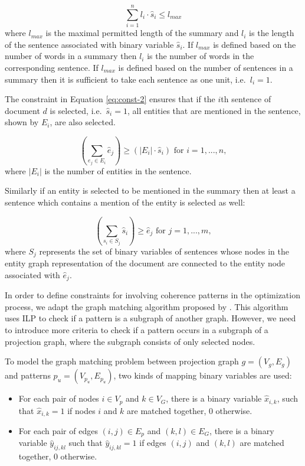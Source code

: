 \begin{equation}
\sum_{i=1}^{n} l_i \cdot \hat{s}_i \le l_{max}
\end{equation}
where $l_{max}$ is the maximal permitted length of the summary and $l_i$ is the length of the sentence associated with binary variable $\hat{s}_i$.  
If $l_{max}$ is defined based on the number of words in a summary then $l_i$ is the number of words in the corresponding sentence.  
If $l_{max}$ is defined based on the number of sentences in a summary then it is sufficient to take each sentence as one unit, i.e.\ $l_i=1$. 

The constraint in Equation \ref{eq:const-2} ensures that if the $i$th sentence of document $d$ is selected, i.e.\ $\hat{s}_i = 1$, all entities that are mentioned in the sentence, shown by $E_i$, are also selected. 

\begin{equation}
\label{eq:const-2}
( \sum_{e_j\in E_i}{\hat{e}_j} )  \ge (|E_i| \cdot \hat{s}_i) \text{   for   }i = 1,...,n,
\end{equation} 
where $|E_i|$ is the number of entities in the sentence.  

Similarly if an entity is selected to be mentioned in the summary then at least a sentence which contains a mention of the entity is selected as well:   

\begin{equation}
(\sum_{s_i \in S_j}{\hat{s}_i}) \ge \hat{e}_j\text{ for }j = 1,...,m,
\end{equation}
where $S_j$ represents the set of binary variables of sentences whose nodes in the entity graph representation of the document are connected to the entity node associated with $\hat{e}_j$.  

In order to define constraints for involving coherence patterns in the optimization process, we adapt the graph matching algorithm proposed by .
This algorithm uses ILP to check if a pattern is a subgraph of another graph. 
However, we need to introduce more criteria to check if a pattern occurs in a subgraph of a projection graph,  where the subgraph consists of only selected nodes. 

To model the graph matching problem between projection graph $g=(V_{g},E_{g})$ and patterns $p_{u}=(V_{p_{u}},E_{p_{u}})$, two kinds of mapping binary variables are used: 

\begin{itemize}

	\item 
	For each pair of nodes $i \in V_{p}$ and $k \in V_G$, there is a binary variable $\hat{x}_{i,k}$, such that $\hat{x}_{i,k} = 1$ if nodes $i$ and $k$ are matched together, $0$ otherwise. 

	\item For each pair of edges $(i,j) \in E_{p}$ and $(k,l) \in E_G$, there is a binary variable $\hat{y}_{ij,kl}$ such that $\hat{y}_{ij,kl} = 1$ if edges $(i,j)$ and $(k,l)$ are matched together, $0$ otherwise.

\end{itemize}

